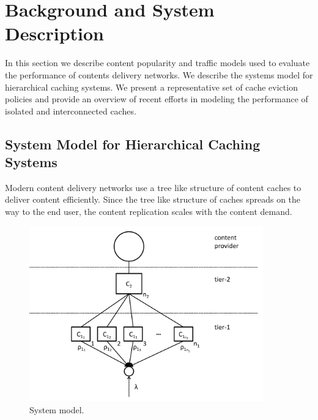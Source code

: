 \section{Background and System Description}\label{sec:hierarchical:related_work}

In this section we describe content popularity and traffic models used to evaluate the performance of contents delivery networks.
We describe the systems model for hierarchical caching systems.
We present a representative set of cache eviction policies and provide an overview of recent efforts in modeling the performance of isolated and interconnected caches.

\subsection{System Model for Hierarchical Caching Systems}\label{sec:hierarchical:system_model}

Modern content delivery networks use a tree like structure of content caches to deliver content efficiently.
Since the tree like structure of caches spreads on the way to the end user, the content replication scales with the content demand.

\begin{figure}[tb]
\centering
\includegraphics[width=0.9\textwidth]{hierarchical/analyticbw/figures/hcmodeln1}
\caption{System model.}
\label{fig:hcmodel}
\end{figure}

